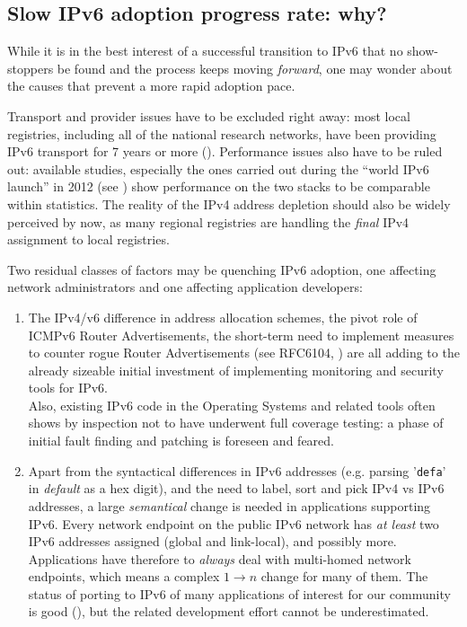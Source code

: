 \subsection{Slow IPv6 adoption progress rate: why?}
While it is in the best interest of a successful transition to IPv6 that  
no show-stoppers be found and the process keeps moving {\it forward},
one may wonder about the causes that prevent a more rapid adoption pace.\par
Transport and provider issues have to be excluded right away: most
local registries, including all of the national research networks, have been
providing IPv6 transport for 7 years or more (\cite{ripeness}). Performance issues also have to
be ruled out: available studies, especially the ones carried out during the
``world IPv6 launch'' in 2012 (see \cite{wdayperf}) show performance on 
the two stacks to be comparable within statistics. The reality of the IPv4 
address depletion
should also be widely perceived by now, as many regional registries are
handling the {\it final} IPv4 assignment to local registries.\par
Two residual classes of factors may be quenching IPv6 adoption, one
affecting network administrators and one affecting application developers:
\begin{enumerate}
\item {\small
The IPv4/v6 difference in address allocation schemes, the pivot role of
ICMPv6 Router Advertisements, the short-term
need to implement measures to counter rogue Router Advertisements 
(see RFC6104, \cite{rfc}) are all adding to the already sizeable initial 
investment of implementing monitoring and security tools for IPv6.\\
Also, existing IPv6 code in the Operating Systems and related tools often
shows by inspection not to have underwent full coverage testing:
a phase of initial fault finding and patching is foreseen and feared.
}
\item {\small
Apart from the syntactical differences in IPv6 addresses (e.g. parsing
'{\tt defa}' in {\it default} as a hex digit), and the need to label, sort and 
pick IPv4 vs IPv6 addresses, a large {\it semantical} change is
needed in applications supporting IPv6. Every network endpoint on the
public IPv6 network has {\it at least} two IPv6 addresses assigned (global
and link-local), and possibly more. Applications have therefore
to {\it always} deal with multi-homed network endpoints, which means a complex
$1\rightarrow n$ change for many of them. The status of porting to IPv6 of
many applications of interest for our community is good (\cite{readiness}),
but the related development effort cannot be underestimated.
}
\end{enumerate}
